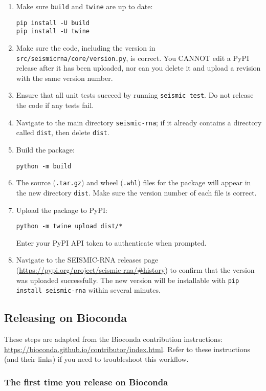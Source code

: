 \documentclass[main.tex]{subfiles}
\begin{document}
\begin{enumerate}
    \item Make sure \verb|build| and \verb|twine| are up to date:
        \begin{verbatim}
pip install -U build
pip install -U twine
        \end{verbatim}
    \item Make sure the code, including the version in \verb|src/seismicrna/core/version.py|, is correct. You CANNOT edit a PyPI release after it has been uploaded, nor can you delete it and upload a revision with the same version number.
    \item Ensure that all unit tests succeed by running \verb|seismic test|. Do not release the code if any tests fail.
    \item Navigate to the main directory \verb|seismic-rna|; if it already contains a directory called \verb|dist|, then delete \verb|dist|.
    \item Build the package:
        \begin{verbatim}
python -m build
        \end{verbatim}
    \item The source (\verb|.tar.gz|) and wheel (\verb|.whl|) files for the package will appear in the new directory \verb|dist|. Make sure the version number of each file is correct.
    \item Upload the package to PyPI:
        \begin{verbatim}
python -m twine upload dist/*
        \end{verbatim}
        Enter your PyPI API token to authenticate when prompted.
    \item Navigate to the SEISMIC-RNA releases page (\url{https://pypi.org/project/seismic-rna/#history}) to confirm that the version was uploaded successfully. The new version will be installable with \verb|pip install seismic-rna| within several minutes.
\end{enumerate}


\subsection{Releasing on Bioconda}

These steps are adapted from the Bioconda contribution instructions: \url{https://bioconda.github.io/contributor/index.html}.
Refer to these instructions (and their links) if you need to troubleshoot this workflow.

\subsubsection{The first time you release on Bioconda}
\end{document}
